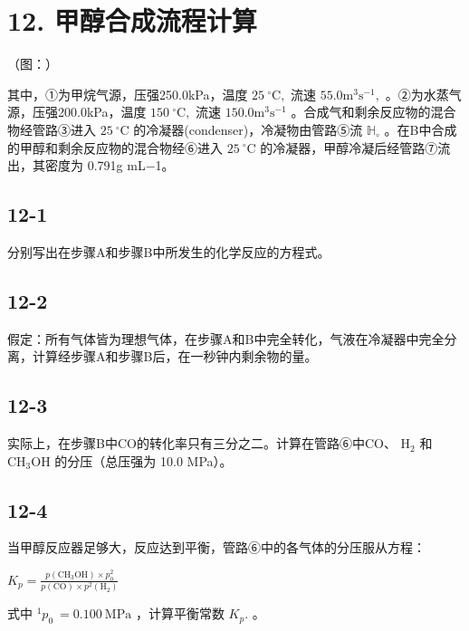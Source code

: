 \section*{12. 甲醇合成流程计算}
（图：）

其中，①为甲烷⽓源，压强250.0kPa，温度 $2 5 \ { } ^ { \circ } \mathrm { C } ,$ 流速 $5 5 . 0 \mathrm { m } ^ { 3 } \mathrm { s } ^ { - 1 } ,$ 。②为⽔蒸⽓源，压强200.0kPa，温度 $1 5 0 ~ ^ { \circ } \mathrm { C } ,$ 流速 $1 5 0 . 0 \mathrm { { m } ^ { 3 } \mathrm { { s } ^ { - 1 } } }$ 。合成⽓和剩余反应物的混合物经管路③进⼊ $2 5 ~ ^ { \circ } \mathrm { C }$ 的冷凝器(condenser)，冷凝物由管路⑤流 $\mathbb { H } _ { \circ }$ 。在B中合成的甲醇和剩余反应物的混合物经⑥进⼊ $2 5 ~ ^ { \circ } \mathrm { C }$ 的冷凝器，甲醇冷凝后经管路⑦流出，其密度为 0.791g mL−1。

\subsection*{12-1}
分别写出在步骤A和步骤B中所发⽣的化学反应的⽅程式。

\subsection*{12-2}
假定：所有⽓体皆为理想⽓体，在步骤A和B中完全转化，⽓液在冷凝器中完全分离，计算经步骤A和步骤B后，在⼀秒钟内剩余物的量。

\subsection*{12-3}
实际上，在步骤B中CO的转化率只有三分之⼆。计算在管路⑥中CO、 $\mathrm { H } _ { 2 }$ 和 $\mathrm { C H _ { 3 } O H }$ 的分压（总压强为 10.0 MPa）。

\subsection*{12-4}
当甲醇反应器⾜够⼤，反应达到平衡，管路⑥中的各⽓体的分压服从⽅程：

$
K _ {p} = \frac {p (\mathrm{CH} _ {3} \mathrm{OH}) \times p _ {0} ^ {2}}{p (\mathrm{CO}) \times p ^ {2} (\mathrm{H} _ {2})}
$

式中 ${ } ^ { 1 } p _ { 0 } \ = 0 . 1 0 0 \ \mathrm { M P a }$ ，计算平衡常数 $K _ { p } .$ 。
